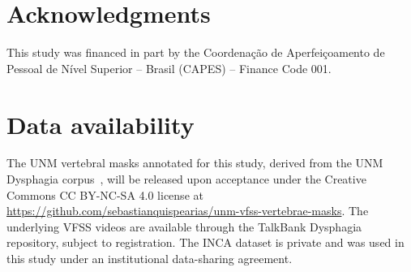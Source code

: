 \documentclass[a4paper,fleqn]{cas-dc}
\begin{document}
\section*{Acknowledgments}
This study was financed in part by the Coordena\c{c}\~{a}o de Aperfei\c{c}oamento de Pessoal de N\'{i}vel Superior -- Brasil (CAPES) -- Finance Code 001.

\section*{Data availability}
The UNM vertebral masks annotated for this study, derived from the UNM Dysphagia corpus~\citep{ref_talkbank}, will be released upon acceptance under the Creative Commons CC BY-NC-SA 4.0 license at \url{https://github.com/sebastianquispearias/unm-vfss-vertebrae-masks}.
The underlying VFSS videos are available through the TalkBank Dysphagia repository, subject to registration.
The INCA dataset is private and was used in this study under an institutional data-sharing agreement.

\printcredits
\end{document}
